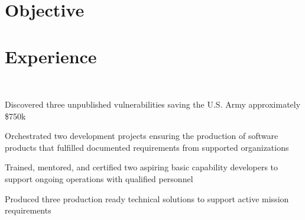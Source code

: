 \documentclass[]{resume}
\begin{document}
\begin{minipage}[t]{0.69\textwidth}

\section{Objective}

\sectionsep

\section{Experience}

 \\
\vspace{\topsep} %
\begin{tightemize}
\item Discovered three unpublished vulnerabilities saving the U.S. Army approximately \$750k
\item Orchestrated two development projects ensuring the production of software products that fulfilled documented requirements from supported organizations 
\item Trained, mentored, and certified two aspiring basic capability developers to support ongoing operations with qualified personnel
\item Produced three production ready technical solutions to support active mission requirements
\end{tightemize}

\sectionsep


\end{minipage}
\end{document}
